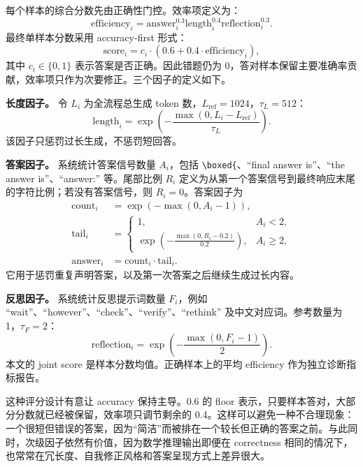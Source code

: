 \documentclass[conference]{IEEEtran}
\begin{document}
每个样本的综合分数先由正确性门控。效率项定义为：
\begin{equation}
\text{efficiency}_i =
\text{answer}^{0.3}_i
\text{length}^{0.4}_i
\text{reflection}^{0.3}_i.
\end{equation}
最终单样本分数采用 accuracy-first 形式：
\begin{equation}
\text{score}_i = c_i \cdot \left(0.6 + 0.4 \cdot \text{efficiency}_i\right),
\end{equation}
其中 $c_i \in \{0,1\}$ 表示答案是否正确。因此错题仍为 0，答对样本保留主要准确率贡献，效率项只作为次要修正。三个因子的定义如下。

\textbf{长度因子。} 令 $L_i$ 为全流程总生成 token 数，$L_{\text{ref}}=1024$，$\tau_L=512$：
\begin{equation}
\text{length}_i=\exp\left(-\frac{\max(0,L_i-L_{\text{ref}})}{\tau_L}\right).
\end{equation}
该因子只惩罚过长生成，不惩罚短回答。

\textbf{答案因子。} 系统统计答案信号数量 $A_i$，包括 \texttt{\textbackslash boxed\{}、``final answer is''、``the answer is''、``answer:'' 等。尾部比例 $R_i$ 定义为从第一个答案信号到最终响应末尾的字符比例；若没有答案信号，则 $R_i=0$。答案因子为
\begin{align}
\text{count}_i &= \exp\left(-\max(0,A_i-1)\right),\\
\text{tail}_i &= 
\begin{cases}
1, & A_i < 2,\\
\exp\left(-\frac{\max(0,R_i-0.2)}{0.2}\right), & A_i \ge 2,
\end{cases}\\
\text{answer}_i &= \text{count}_i \cdot \text{tail}_i.
\end{align}
它用于惩罚重复声明答案，以及第一次答案之后继续生成过长内容。

\textbf{反思因子。} 系统统计反思提示词数量 $F_i$，例如 ``wait''、``however''、``check''、``verify''、``rethink'' 及中文对应词。参考数量为 1，$\tau_F=2$：
\begin{equation}
\text{reflection}_i=\exp\left(-\frac{\max(0,F_i-1)}{2}\right).
\end{equation}
本文的 joint score 是样本分数均值。正确样本上的平均 efficiency 作为独立诊断指标报告。

这种评分设计有意让 accuracy 保持主导。0.6 的 floor 表示，只要样本答对，大部分分数就已经被保留，效率项只调节剩余的 0.4。这样可以避免一种不合理现象：一个很短但错误的答案，因为“简洁”而被排在一个较长但正确的答案之前。与此同时，次级因子依然有价值，因为数学推理输出即便在 correctness 相同的情况下，也常常在冗长度、自我修正风格和答案呈现方式上差异很大。
\end{document}
